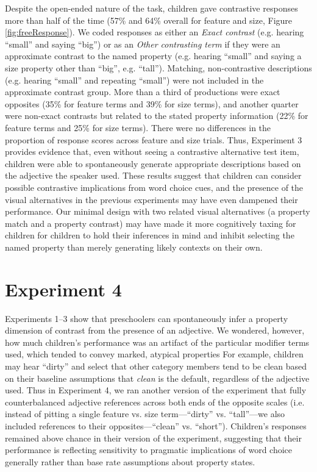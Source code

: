 \documentclass[man]{apa2}
\begin{document}
Despite the open-ended nature of the task, children gave contrastive responses more than half of the time (57\% and 64\% overall for feature and size, Figure \ref{fig:freeResponse}).  We coded responses as either an \emph{Exact contrast} (e.g. hearing ``small'' and saying ``big'') or as an \emph{Other contrasting term} if they were an approximate contrast to the named property (e.g. hearing ``small'' and saying a size property other than ``big'', e.g. ``tall''). Matching, non-contrastive descriptions (e.g. hearing ``small'' and repeating ``small'') were not included in the approximate contrast group. More than a third of productions were exact opposites (35\% for feature terms and 39\% for size terms), and another quarter were non-exact contrasts but related to the stated property information (22\% for feature terms and 25\% for size terms). There were no differences in the proportion of response scores across feature and size trials. Thus, Experiment 3 provides evidence that, even without seeing a contrastive alternative test item, children were able to spontaneously generate appropriate descriptions based on the adjective the speaker used. These results suggest that children can consider possible contrastive implications from word choice cues, and the presence of the visual alternatives in the previous experiments may have even dampened their performance. Our minimal design with two related visual alternatives (a property match and a property contrast) may have made it more cognitively taxing for children for children to hold their inferences in mind and inhibit selecting the named property than merely generating likely contexts on their own.

\section{Experiment 4} 

Experiments 1--3 show that preschoolers can spontaneously infer a property dimension of contrast from the presence of an adjective. We wondered, however, how much children's performance was an artifact of the particular modifier terms used, which tended to convey marked, atypical properties For example, children may hear ``dirty'' and select that other category members tend to be clean based on their baseline assumptions that \emph{clean} is the default, regardless of the adjective used. Thus in Experiment 4, we ran another version of the experiment that fully counterbalanced adjective references across both ends of the opposite scales (i.e. instead of pitting a single feature vs. size term---``dirty'' vs. ``tall''---we also included references to their opposites---``clean'' vs. ``short'').  Children's responses remained above chance in their version of the experiment, suggesting that their performance is reflecting sensitivity to pragmatic implications of word choice generally rather than base rate assumptions about property states.
\end{document}
